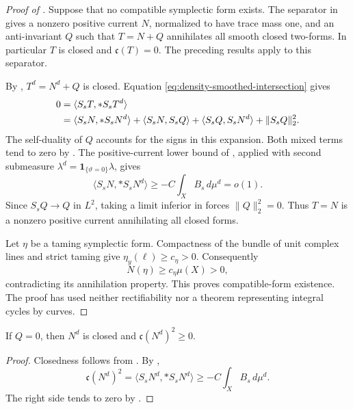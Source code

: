 \begin{proof}[Proof of ]
Suppose that no compatible symplectic form exists.
The separator in  gives a nonzero positive
current \(N\), normalized to have trace mass one, and an
anti-invariant \(Q\) such that \(T=N+Q\) annihilates all smooth closed
two-forms.  In particular \(T\) is closed and
\(\mathfrak c(T)=0\).
The preceding results apply to this separator.

By , \(T^d=N^d+Q\) is closed.  Equation
\eqref{eq:density-smoothed-intersection} gives
\begin{align}
 0
 &=\langle S_sT,*S_sT^d\rangle\notag\\
 &=\langle S_sN,*S_sN^d\rangle
   +\langle S_sN,S_sQ\rangle
   +\langle S_sQ,S_sN^d\rangle
   +\|S_sQ\|_2^2 .
 \label{eq:density-compatibility-pairing}
\end{align}
The self-duality of \(Q\) accounts for the signs in this expansion.
Both mixed terms tend to zero by .
The positive-current lower bound of
, applied with second submeasure
\(\lambda^d=\mathbf1_{\{\vartheta=0\}}\lambda\), gives
\[
 \langle S_sN,*S_sN^d\rangle
 \ge -C\int_XB_s\,d\mu^d=o(1).
\]
Since \(S_sQ\to Q\) in \(L^2\), taking a limit inferior in
 forces \(\|Q\|_2^2=0\).
Thus \(T=N\) is a nonzero positive current annihilating all closed
forms.

Let \(\eta\) be a taming symplectic form.  Compactness of the bundle
of unit complex lines and strict taming give
\(\eta_y(\ell)\ge c_\eta>0\).  Consequently
\[
 N(\eta)\ge c_\eta\mu(X)>0,
\]
contradicting its annihilation property.
This proves compatible-form existence.  The proof has used neither
rectifiability nor a theorem representing integral cycles by curves.
\end{proof}

\begin{lemma}\label{lem:density-diffuse-square}
If \(Q=0\), then \(N^d\) is closed and
\(\mathfrak c(N^d)^2\ge0\).
\end{lemma}

\begin{proof}
Closedness follows from .  By
,
\[
 \mathfrak c(N^d)^2
 =\langle S_sN^d,*S_sN^d\rangle
 \ge -C\int_X B_s\,d\mu^d.
\]
The right side tends to zero by
.
\end{proof}

